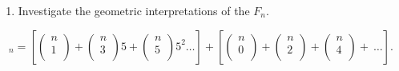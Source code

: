 \documentclass[10pt,letter]{article}
\begin{document}
\begin{enumerate}
\def\labelenumi{\arabic{enumi}.}

\item
  Investigate the geometric interpretations of the \(F_{n}\).

\end{enumerate}

\[
_{n} = \left\lbrack \begin{pmatrix}
n \\
1 \\
\end{pmatrix} + \begin{pmatrix}
n \\
3 \\
\end{pmatrix}5 + \begin{pmatrix}
n \\
5 \\
\end{pmatrix}5^{2}\ldots \right\rbrack + \left\lbrack \begin{pmatrix}
n \\
0 \\
\end{pmatrix} + \begin{pmatrix}
n \\
2 \\
\end{pmatrix} + \begin{pmatrix}
n \\
4 \\
\end{pmatrix} + \ \ldots \right\rbrack.
\]
\end{document}
